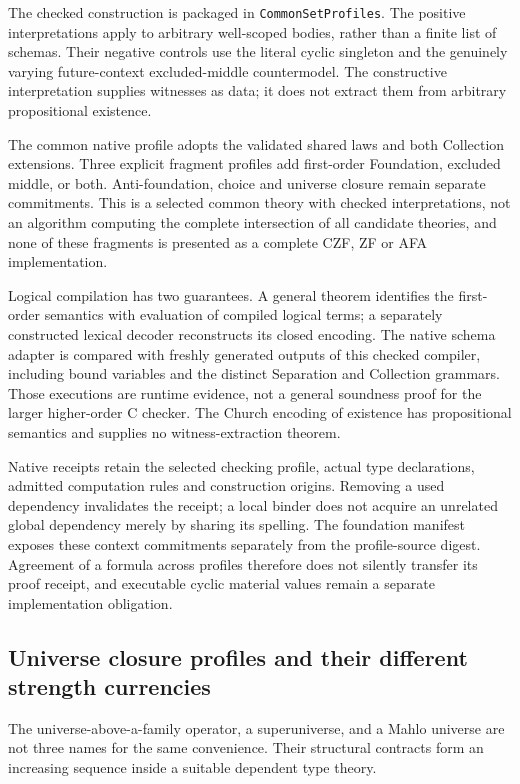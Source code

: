 \documentclass[11pt]{article}
\theoremstyle{definition}
\theoremstyle{remark}
\newcommand{\code}[1]{\texttt{#1}}
\begin{document}
The checked construction is packaged in \code{CommonSetProfiles}.  The positive
interpretations apply to arbitrary well-scoped bodies, rather than a finite
list of schemas.  Their negative controls use the literal cyclic singleton and
the genuinely varying future-context excluded-middle countermodel.  The
constructive interpretation supplies witnesses as data; it does not extract
them from arbitrary propositional existence.

The common native profile adopts the validated shared laws and both Collection
extensions.  Three explicit fragment profiles add first-order Foundation,
excluded middle, or both.  Anti-foundation, choice and universe closure remain
separate commitments.  This is a selected common theory with checked
interpretations, not an algorithm computing the complete intersection of all
candidate theories, and none of these fragments is presented as a complete
CZF, ZF or AFA implementation.

Logical compilation has two guarantees.  A general theorem identifies the
first-order semantics with evaluation of compiled logical terms; a
separately constructed lexical decoder reconstructs its closed encoding.
The native schema adapter is compared with freshly generated outputs of this
checked compiler, including bound variables and the distinct Separation and
Collection grammars.  Those executions are runtime evidence, not a general
soundness proof for the larger higher-order C checker.  The Church encoding of
existence has propositional semantics and supplies no witness-extraction theorem.

Native receipts retain the selected checking profile, actual type declarations,
admitted computation rules and construction origins.  Removing a used dependency
invalidates the receipt; a local binder does not acquire an unrelated global
dependency merely by sharing its spelling.  The foundation manifest exposes
these context commitments separately from the profile-source digest.  Agreement
of a formula across profiles therefore does not silently transfer its proof
receipt, and executable cyclic material values remain a separate implementation
obligation.

\subsection{Universe closure profiles and their different strength currencies}

The universe-above-a-family operator, a superuniverse, and a Mahlo universe are
not three names for the same convenience.  Their structural contracts form an
increasing sequence inside a suitable dependent type theory.
\end{document}
